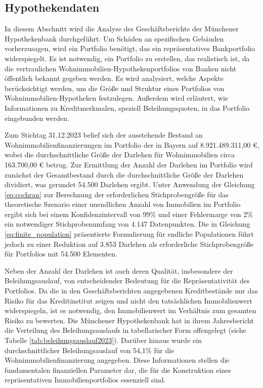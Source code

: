 \subsection{Hypothekendaten}
In diesem Abschnitt wird die Analyse des Geschäftsberichts der Münchener Hypothekenbank durchgeführt. Um Schäden an spezifischen Gebäuden vorherzusagen, wird ein Portfolio benötigt, das ein repräsentatives Bankportfolio widerspiegelt. Es ist notwendig, ein Portfolio zu erstellen, das realistisch ist, da die vertraulichen Wohnimmobilien-Hypothekenportfolios von Banken nicht öffentlich bekannt gegeben werden. Es wird analysiert, welche Aspekte berücksichtigt werden, um die Größe und Struktur eines Portfolios von Wohnimmobilien-Hypotheken festzulegen. Außerdem wird erläutert, wie Informationen zu Kreditmerkmalen, speziell Beleihungsquoten, in das Portfolio eingebunden werden.

Zum Stichtag 31.12.2023 belief sich der ausstehende Bestand an Wohnimmobilienfinanzierungen im Portfolio der \textcite{MuenchenerHyp2023} in Bayern auf 8.921.489.311,00 €, wobei die durchschnittliche Größe der Darlehen für Wohnimmobilien circa 163.700,00 € betrug. Zur Ermittlung der Anzahl der Darlehen im Portfolio wird zunächst der Gesamtbestand durch die durchschnittliche Größe der Darlehen dividiert, was gerundet 54.500 Darlehen ergibt. Unter Anwendung der Gleichung \ref{eq:cochran} zur Berechnung der erforderlichen Stichprobengröße für das theoretische Szenario einer unendlichen Anzahl von Immobilien im Portfolio ergibt sich bei einem Konfidenzintervall von 99\% und einer Fehlermarge von 2\% ein notwendiger Stichprobenumfang von 4.147 Datenpunkten. Die in Gleichung \ref{eq:finite_population} präsentierte Formulierung für endliche Populationen führt jedoch zu einer Reduktion auf 3.853 Darlehen als erforderliche Stichprobengröße für Portfolios mit 54.500 Elementen.

Neben der Anzahl der Darlehen ist auch deren Qualität, insbesondere der Beleihungsauslauf, von entscheidender Bedeutung für die Repräsentativität des Portfolios. Da die in den Geschäftsberichten angegebenen Kreditbestände nur das Risiko für das Kreditinstitut zeigen und nicht den tatsächlichen Immobilienwert widerspiegeln, ist es notwendig, den Immobilienwert im Verhältnis zum gesamten Risiko zu bewerten. Die Münchener Hypothekenbank hat in ihrem Jahresbericht die Verteilung des Beleihungsauslaufs in tabellarischer Form offengelegt (siehe Tabelle \ref{tab:beleihungsauslauf2023}). Darüber hinaus wurde ein durchschnittlicher Beleihungsauslauf von 54,1\% für die Wohnimmobilienfinanzierung angegeben. Diese Informationen stellen die fundamentalen finanziellen Parameter dar, die für die Konstruktion eines repräsentativen Immobilienportfolios essenziell sind.


